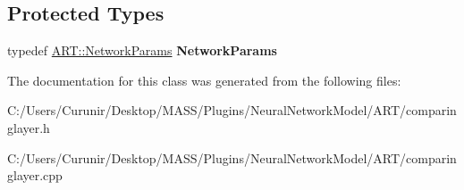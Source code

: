 \subsection*{Protected Types}
\begin{DoxyCompactItemize}
\item 
\mbox{\label{class_comparing_layer_af0bbef51f4b8cc8693626693a25b3b3f}} 
typedef \hyperlink{struct_a_r_t_1_1_network_params}{A\+R\+T\+::\+Network\+Params} {\bfseries Network\+Params}
\end{DoxyCompactItemize}


The documentation for this class was generated from the following files\+:\begin{DoxyCompactItemize}
\item 
C\+:/\+Users/\+Curunir/\+Desktop/\+M\+A\+S\+S/\+Plugins/\+Neural\+Network\+Model/\+A\+R\+T/comparinglayer.\+h\item 
C\+:/\+Users/\+Curunir/\+Desktop/\+M\+A\+S\+S/\+Plugins/\+Neural\+Network\+Model/\+A\+R\+T/comparinglayer.\+cpp\end{DoxyCompactItemize}
